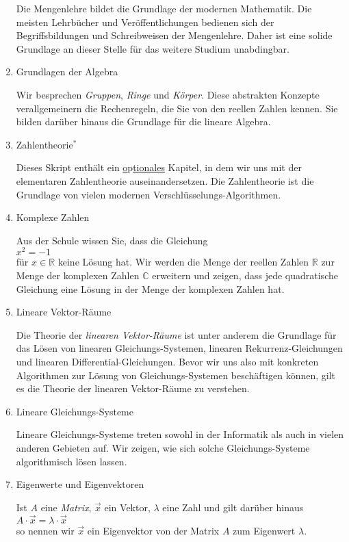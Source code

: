 \begin{enumerate}
      Die Mengenlehre bildet die Grundlage der modernen Mathematik.  Die meisten Lehrb\"{u}cher und
      Ver\"{o}ffentlichungen bedienen sich der Begriffsbildungen und Schreibweisen der Mengenlehre.
      Daher ist eine solide Grundlage an dieser Stelle f\"{u}r das weitere Studium unabdingbar.
\item Grundlagen der Algebra

      Wir besprechen \emph{Gruppen}, \emph{Ringe} und \emph{K\"{o}rper}.  Diese abstrakten Konzepte
      verallgemeinern  die Rechenregeln, die Sie von den reellen Zahlen kennen.  Sie bilden dar\"{u}ber
      hinaus die Grundlage f\"{u}r die lineare Algebra.
\item Zahlentheorie$^*$
  
      Dieses Skript enth\"{a}lt ein \underline{o}p\underline{tionales} Kapitel, in dem wir uns mit der 
      elementaren Zahlentheorie auseinandersetzen.  Die Zahlentheorie ist die Grundlage
      von vielen modernen Verschl\"{u}sselungs-Algorithmen.
\item Komplexe Zahlen

      Aus der Schule wissen Sie, dass die Gleichung
      \\[0.2cm]
      \hspace*{1.3cm}
      $x^2 = -1$
      \\[0.2cm]
      f\"{u}r $x \in \mathbb{R}$ keine L\"{o}sung hat.  Wir werden die Menge der reellen Zahlen $\mathbb{R}$
      zur Menge der komplexen Zahlen $\mathbb{C}$ erweitern und zeigen, dass jede quadratische
      Gleichung eine L\"{o}sung in der Menge der komplexen Zahlen hat.
\item Lineare Vektor-R\"{a}ume

      Die Theorie der \emph{linearen Vektor-R\"{a}ume} ist unter anderem die Grundlage f\"{u}r das L\"{o}sen von linearen
      Gleichungs-Systemen, linearen Rekurrenz-Gleichungen und linearen Differential-Gleichungen.
      Bevor wir uns also mit konkreten Algorithmen zur L\"{o}sung von Gleichungs-Systemen besch\"{a}ftigen
      k\"{o}nnen, gilt es die Theorie der linearen Vektor-R\"{a}ume zu verstehen.
\item Lineare Gleichungs-Systeme

      Lineare Gleichungs-Systeme treten sowohl in der Informatik als auch in vielen anderen Gebieten auf. 
      Wir zeigen, wie sich solche Gleichungs-Systeme algorithmisch l\"{o}sen lassen.
\item Eigenwerte und Eigenvektoren

      Ist $A$ eine \emph{Matrix},  $\vec{x}$ ein Vektor, $\lambda$ eine Zahl und gilt dar\"{u}ber hinaus
      \\[0.2cm]
      \hspace*{1.3cm}
      $A \cdot \vec{x} = \lambda \cdot \vec{x}$
      \\[0.2cm]
      so nennen wir $\vec{x}$ ein Eigenvektor von der Matrix $A$ zum Eigenwert $\lambda$.
      

\end{enumerate}
